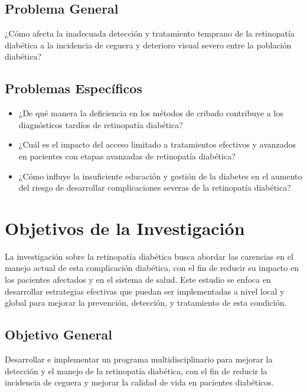 \subsection{Problema General}
\newcommand{\ProblemaGeneral}{
	¿Cómo afecta la inadecuada detección y tratamiento temprano de la retinopatía diabética a la incidencia de ceguera y deterioro visual severo entre la población diabética?
}
\ProblemaGeneral
\subsection{Problemas Espec\'{i}ficos}
\newcommand{\Pbone}{
	¿De qué manera la deficiencia en los métodos de cribado contribuye a los diagnósticos tardíos de retinopatía diabética?
}
\newcommand{\Pbtwo}{
	 ¿Cuál es el impacto del acceso limitado a tratamientos efectivos y avanzados en pacientes con etapas avanzadas de retinopatía diabética?
}
\newcommand{\Pbthree}{
	¿Cómo influye la insuficiente educación y gestión de la diabetes en el aumento del riesgo de desarrollar complicaciones severas de la retinopatía diabética?
}
\newcommand{\Pbfour}{
	W
}
\newcommand{\Pbfive}{
	ES
}

\begin{itemize}
	\item \Pbone
	\item \Pbtwo
	\item \Pbthree
\end{itemize}

\section{Objetivos de la Investigación}

La investigación sobre la retinopatía diabética busca abordar las carencias en el manejo actual de esta complicación diabética, con el fin de reducir su impacto en los pacientes afectados y en el sistema de salud. Este estudio se enfoca en desarrollar estrategias efectivas que puedan ser implementadas a nivel local y global para mejorar la prevención, detección, y tratamiento de esta condición.

\subsection{Objetivo General}
\newcommand{\ObjetivoGeneral}{
	Desarrollar e implementar un programa multidisciplinario para mejorar la detección y el manejo de la retinopatía diabética, con el fin de reducir la incidencia de ceguera y mejorar la calidad de vida en pacientes diabéticos.
}
\ObjetivoGeneral
